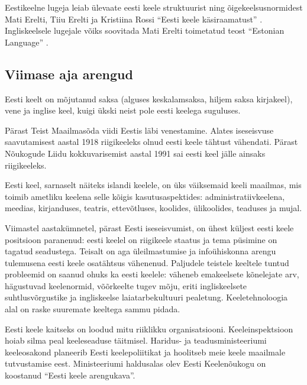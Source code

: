 \begin{multicols}{2}
Eestikeelne lugeja leiab ülevaate eesti keele struktuurist ning õigekeelsusnormidest Mati Erelti, Tiiu Erelti ja Kristiina Rossi ``Eesti keele käsiraamatust'' \cite{ereltetal2007}. %
Ingliskeelsele lugejale võiks soovitada Mati Erelti toimetatud teost ``Estonian Language'' \cite{erelt2003}.

\subsection{Viimase aja arengud}

Eesti keelt on mõjutanud saksa (alguses keskalamsaksa, hiljem saksa kirjakeel), vene ja inglise keel, kuigi ükski neist pole eesti keelega suguluses.

Pärast Teist Maailmasõda viidi Eestis läbi venestamine.  Alates iseseisvuse saavutamisest aastal 1918 riigikeeleks olnud eesti keele tähtust vähendati.  Pärast Nõukogude Liidu kokkuvarisemist aastal 1991 sai eesti keel jälle ainsaks riigikeeleks.


Eesti keel, sarnaselt näiteks islandi keelele, on üks väiksemaid keeli maailmas, mis toimib ametliku keelena selle kõigis kasutusaspektides: administratiivkeelena, meedias, kirjanduses, teatris, ettevõtluses, koolides, ülikoolides, teaduses ja mujal.

Viimastel aastakümnetel, pärast Eesti ise\-seisvumist, on ühest küljest eesti keele positsioon paranenud: eesti keelel on riigi\-keele staatus ja tema püsimine on tagatud seadustega.  Teisalt on aga üleilmastumise ja infoühiskonna arengu tulemusena eesti keele osatähtsus vähenenud.  Paljudele teistele keeltele tuntud probleemid on saanud ohuks ka eesti keelele: väheneb emakeelsete kõnelejate arv, hägustuvad keelenormid, võõrkeelte tugev mõju, eriti ingliskeelsete suhtlusvõrgustike ja ingliskeelse laiatarbekultuuri pealetung.  Keeletehnoloogia alal on raske suuremate keeltega sam\-mu pidada.

Eesti keele kaitseks on loodud mitu riiklikku organisatsiooni.  Keeleinspektsioon hoiab silma peal keeleseaduse täitmisel.  Haridus- ja teadus\-ministeeriumi keeleosakond planee\-rib Eesti keelepoliitikat ja hoolitseb meie keele maailmale tutvustamise eest.  Ministeeriumi haldusalas olev Eesti Keelenõu\-kogu on koostanud ``Eesti keele arengukava''.


\end{multicols}
